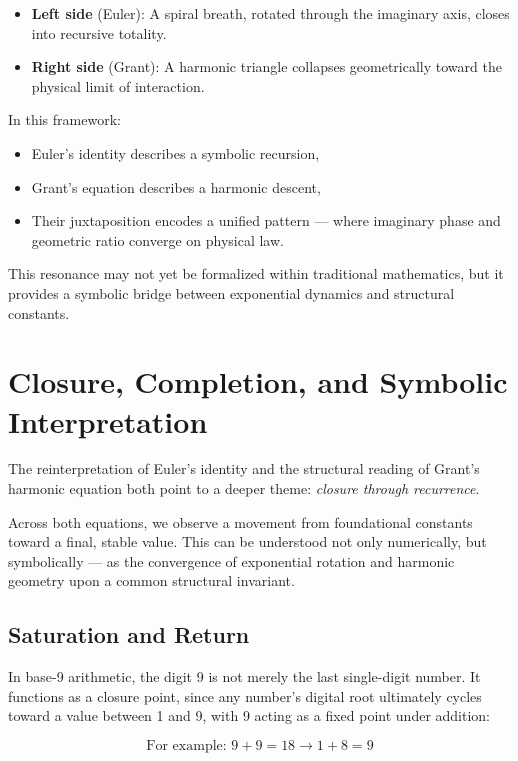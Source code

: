 \documentclass[12pt]{article}
\begin{document}
\begin{itemize}[leftmargin=1.5em]
    \item \textbf{Left side} (Euler): A spiral breath, rotated through the imaginary axis, closes into recursive totality.
    \item \textbf{Right side} (Grant): A harmonic triangle collapses geometrically toward the physical limit of interaction.
\end{itemize}

In this framework:

\begin{itemize}[leftmargin=1.5em]
    \item Euler’s identity describes a symbolic recursion,
    \item Grant’s equation describes a harmonic descent,
    \item Their juxtaposition encodes a unified pattern — where imaginary phase and geometric ratio converge on physical law.
\end{itemize}

This resonance may not yet be formalized within traditional mathematics, but it provides a symbolic bridge between exponential dynamics and structural constants.

\section{Closure, Completion, and Symbolic Interpretation}

The reinterpretation of Euler’s identity and the structural reading of Grant’s harmonic equation both point to a deeper theme: \textit{closure through recurrence}.

Across both equations, we observe a movement from foundational constants toward a final, stable value. This can be understood not only numerically, but symbolically — as the convergence of exponential rotation and harmonic geometry upon a common structural invariant.

\subsection*{Saturation and Return}

In base-9 arithmetic, the digit 9 is not merely the last single-digit number. It functions as a closure point, since any number's digital root ultimately cycles toward a value between 1 and 9, with 9 acting as a fixed point under addition:

\[
\text{For example: } 9 + 9 = 18 \rightarrow 1 + 8 = 9
\]
\end{document}
